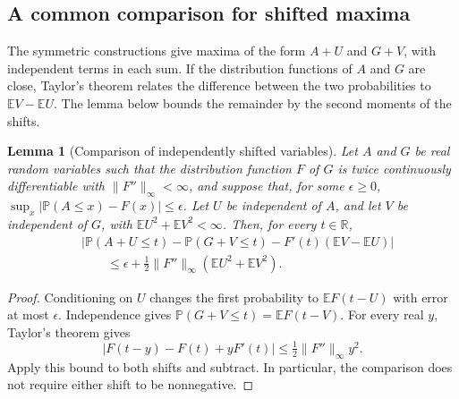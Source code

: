 \documentclass[11pt,letterpaper]{article}
\newtheorem{lemma}{Lemma}
\theoremstyle{remark}
\newcommand{\E}{\mathbb E}
\newcommand{\Pp}{\mathbb P}
\newcommand{\R}{\mathbb R}
\begin{document}
\subsection{A common comparison for shifted maxima}
\label{app:lower-comparison}

The symmetric constructions give maxima of the form \(A+U\) and
\(G+V\), with independent terms in each sum. If the distribution
functions of \(A\) and \(G\) are close, Taylor's theorem relates the
difference between the two probabilities to \(\E V-\E U\).
The lemma below bounds the remainder by the second moments of the shifts.

\begin{lemma}[Comparison of independently shifted variables]
\label{lower:shift-comparison}
Let \(A\) and \(G\) be real random variables such that the distribution
function \(F\) of \(G\) is twice continuously differentiable with
\(\|F''\|_\infty<\infty\), and suppose that, for some \(\epsilon\ge0\),
\(\sup_x|\Pp(A\le x)-F(x)|\le\epsilon\).
Let \(U\) be independent of \(A\), and let \(V\) be independent of \(G\),
with \(\E U^2+\E V^2<\infty\). Then, for every \(t\in\R\),
\begin{equation}
\begin{split}
&\left|\Pp(A+U\le t)-\Pp(G+V\le t)
       -F'(t)(\E V-\E U)\right|\\
&\hspace{2em}\le \epsilon+
       \frac12\|F''\|_\infty(\E U^2+\E V^2).
\end{split}
\label{lower:eq:shift-comparison}
\end{equation}
\end{lemma}

\begin{proof}
Conditioning on \(U\) changes the first probability to
\(\E F(t-U)\) with error at most \(\epsilon\). Independence gives
\(\Pp(G+V\le t)=\E F(t-V)\). For every real \(y\), Taylor's theorem gives
\[
 |F(t-y)-F(t)+yF'(t)|\le \tfrac12\|F''\|_\infty y^2.
\]
Apply this bound to both shifts and subtract. In particular, the
comparison does not require either shift to be nonnegative.
\end{proof}
\end{document}
